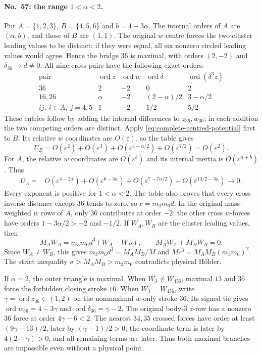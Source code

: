\documentclass[11pt]{amsart}
\theoremstyle{remark}
\newcommand{\ord}{\operatorname{ord}}
\begin{document}
\paragraph{No.~57: the range $1<\alpha<2$.}
Put $A=\{1,2,3\}$, $B=\{4,5,6\}$ and $b=4-3\alpha$.
The internal orders of $A$ are $(\alpha,b)$, and those of $B$ are $(1,1)$.
The original $w$ centre forces the two cluster leading values to be distinct: if they were equal, all six nonzero circled leading values would agree. Hence the bridge $36$ is maximal, with orders $(2,-2)$ and $\delta_{36}\to d\ne0$.
All nine cross pairs have the following exact orders:
\[
\begin{array}{c|c|c|c|c}
\text{pair}&\ord z&\ord w&\ord\delta&\ord(\delta^3z)\\ \hline
36&2&-2&0&2\\
16,26&\alpha&-2&(2-\alpha)/2&3-\alpha/2\\
 i j,\ i\in A,\ j=4,5&1&-2&1/2&5/2
\end{array}
\]
These entries follow by adding the internal differences to $z_{36},w_{36}$; in each addition the two competing orders are distinct.
Apply \eqref{eq:complete-centred-potential} first to $B$.
Its relative $w$ coordinates are $O(\varepsilon)$, so the table gives
\[
 U_B=O(\varepsilon^2)+O(\varepsilon^3)
      +O(\varepsilon^{4-\alpha/2})+O(\varepsilon^{7/2})
      =O(\varepsilon^2).
\]
For $A$, the relative $w$ coordinates are $O(\varepsilon^b)$ and its internal inertia is $O(\varepsilon^{\alpha+b})$. Thus
\begin{equation}\label{eq:no57-complete-potential}
\begin{aligned}
 U_A={}&O(\varepsilon^{4-2\alpha})
 +O(\varepsilon^{6-3\alpha})
 +O(\varepsilon^{7-7\alpha/2})
 +O(\varepsilon^{13/2-3\alpha})\longrightarrow0.
\end{aligned}
\end{equation}
Every exponent is positive for $1<\alpha<2$. The table also proves that every cross inverse distance except $36$ tends to zero, so
$c=m_3m_6d$.
In the original mass-weighted $w$ rows of $A$, only $36$ contributes at order $-2$: the other cross $w$-forces have orders $1-3\alpha/2>-2$ and $-1/2$. If $W_A,W_B$ are the cluster leading values, then
\[
 M_AW_A=m_3m_6d^3(W_A-W_B),\qquad
 M_AW_A+M_BW_B=0.
\]
Since $W_A\ne W_B$, this gives $m_3m_6d^3=M_AM_B/M$ and
$Mc^3=M_AM_B(m_3m_6)^2$. The strict inequality
$\sigma>M_AM_B>m_3m_6$ contradicts physical H\"older.

If $\alpha=2$, the outer triangle is maximal. When $W_3\ne W_{456}$, maximal $13$ and $36$ force the forbidden closing stroke $16$. When $W_3=W_{456}$, write $\gamma=\ord z_{36}\in(1,2)$ on the nonmaximal $w$-only stroke $36$. Its signed tie gives $\ord w_{36}=4-3\gamma$ and $\ord\delta_{36}=\gamma-2$. The original body-3 $z$-row has a nonzero $36$ force at order $4\gamma-6<2$. The nearest $34,35$ crossed forces have order at least $(9\gamma-13)/2$, later by $(\gamma-1)/2>0$; the coordinate term is later by $4(2-\gamma)>0$, and all remaining terms are later. Thus both maximal branches are impossible even without a physical point.
\end{document}
